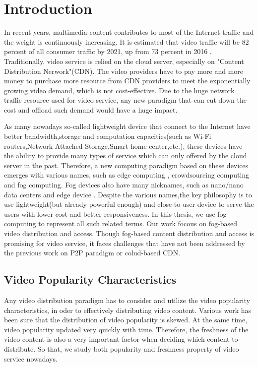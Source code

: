 \chapter{Introduction}
\label{chp:introduction}
In recent years, multimedia content contributes to most of the Internet traffic and the weight is
continuously increasing. It is estimated that video traffic will be 82 percent of all consumer traffic by 2021,
up from 73 percent in 2016 \citep{vniciso}. Traditionally, video service is relied on the cloud server,
especially on "Content Distribution Nerwork"(CDN). The video providers have to pay more and more money to purchase
more resource from CDN providers to meet the exponentially growing video demand, which is not
cost-effective. Due to the huge network traffic resource used for video service, any new paradigm that
can cut down the cost and offload such demand would have a huge impact.

As many nowadays so-called lightweight device that connect to the Internet have
 better bandwidth,storage and computation capacities(such as Wi-Fi routers,Network
Attached Storage,Smart home center,etc.), these devices have the ability to provide many
types of service which can only offered by the cloud server in the past. Therefore, a new computing paradigm
based on these devices emerges with various names, such as edge computing \citep{edgecomputing},
crowdsourcing computing \citep{Chen2015Thunder} and fog computing. Fog devices also have many nicknames,
such as nano/nano data centers \citep{Valancius2009Greening} and edge device \citep{Laoutaris2008ECHOS}.
Despite the various names,the key philosophy is to use lightweight(but already powerful enough) and
close-to-user device to serve the users with lower cost and better responsiveness. In this thesis,
we use fog computing to represent all such related terms.
Our work focous on fog-based video distribution and access. Though fog-based content distribution
and access is promising for video service, it faces challenges that have not been addressed by the
previous work on P2P paradigm or colud-based CDN.

\section{Video Popularity Characteristics}
 Any video distribution paradigm has to consider and utilize the video popularity characteristics,
in oder to effectively distributing video content. Various work has been sure that the distribution
of video popularity is skewed. At the same time, video popularity updated very quickly with
time. Therefore, the freshness of the video  content is also a very important factor when deciding
which content  to distribute. So that, we study both popularity and freshness property of video service
nowadays.
